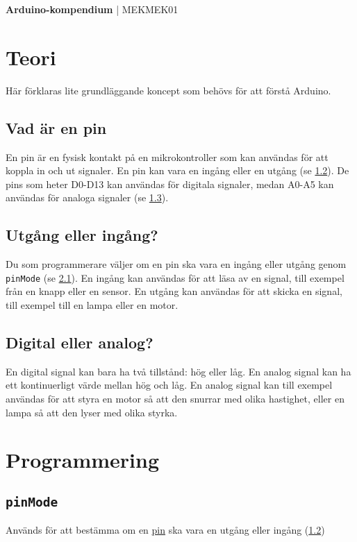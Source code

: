 \documentclass[11pt]{article}
\begin{document}
\raggedright{}
\begin{center}
      \textbf{\huge{Arduino-kompendium}}
      \huge{| MEKMEK01}
\end{center}
\vspace{2em}

\tableofcontents

\newpage

\section{Teori}
Här förklaras lite grundläggande koncept som behövs för att förstå Arduino.

\subsection{Vad är en pin}\label{sec:pin}
En pin är en fysisk kontakt på en mikrokontroller som kan användas för att koppla in och ut signaler. En pin kan vara en ingång eller en utgång (se \ref{sec:io}). De pins som heter D0-D13 kan användas för digitala signaler, medan A0-A5 kan användas för analoga signaler (se \ref{sec:analog}).

\subsection{Utgång eller ingång?}\label{sec:io}
Du som programmerare väljer om en pin ska vara en ingång eller utgång genom \texttt{pinMode} (se \ref{sec:pinmode}). En ingång kan användas för att läsa av en signal, till exempel från en knapp eller en sensor. En utgång kan användas för att skicka en signal, till exempel till en lampa eller en motor.

\subsection{Digital eller analog?}\label{sec:analog}
En digital signal kan bara ha två tillstånd: hög eller låg. En analog signal kan ha ett kontinuerligt värde mellan hög och låg. En analog signal kan till exempel användas för att styra en motor så att den snurrar med olika hastighet, eller en lampa så att den lyser med olika styrka.

\section{Programmering}
\subsection{\texttt{pinMode}}\label{sec:pinmode}
Används för att bestämma om en \hyperref[sec:pin]{pin} ska vara en utgång eller ingång (\ref{sec:io})
\end{document}
